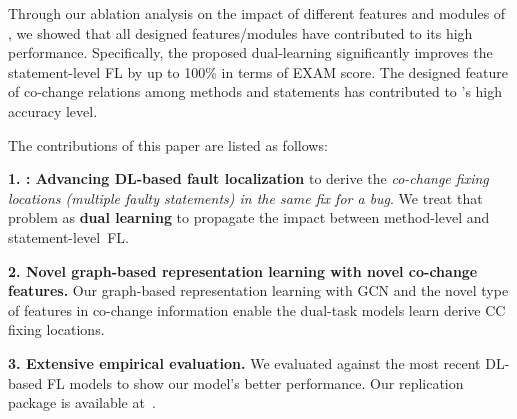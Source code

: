 Through our ablation analysis on the impact of different features and
modules of {\tool}, we showed that all designed features/modules have
contributed to its high performance. Specifically, the proposed
dual-learning significantly improves the statement-level FL by up to
100\% in terms of EXAM score. The designed feature of co-change
relations among methods and statements has contributed to {\tool}'s
high accuracy level.





The contributions of this paper are listed as follows:

{\bf 1. {\tool}: Advancing DL-based fault localization} to derive
the {\em co-change fixing locations (multiple faulty statements) in
  the same fix for a bug}. We treat that problem as {\bf dual learning}
to propagate the impact between method-level and
statement-level~FL.


{\bf 2. Novel graph-based representation learning with novel co-change
  features.} Our graph-based representation learning with GCN and the
novel type of features in co-change information enable the dual-task
models learn derive CC fixing locations.

{\bf 3. Extensive empirical evaluation.} We evaluated {\tool} against
the most recent DL-based FL models to show our model's better
performance. Our replication package is available
at~\cite{FixLocator2022}.

